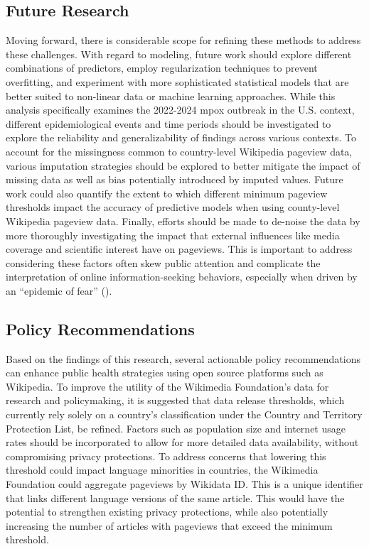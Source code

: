 \documentclass[
  12pt,
]{article}
\begin{document}
\subsection{Future Research}\label{future-research}

Moving forward, there is considerable scope for refining these methods
to address these challenges. With regard to modeling, future work should
explore different combinations of predictors, employ regularization
techniques to prevent overfitting, and experiment with more
sophisticated statistical models that are better suited to non-linear
data or machine learning approaches. While this analysis specifically
examines the 2022-2024 mpox outbreak in the U.S. context, different
epidemiological events and time periods should be investigated to
explore the reliability and generalizability of findings across various
contexts. To account for the missingness common to country-level
Wikipedia pageview data, various imputation strategies should be
explored to better mitigate the impact of missing data as well as bias
potentially introduced by imputed values. Future work could also
quantify the extent to which different minimum pageview thresholds
impact the accuracy of predictive models when using county-level
Wikipedia pageview data. Finally, efforts should be made to de-noise the
data by more thoroughly investigating the impact that external
influences like media coverage and scientific interest have on
pageviews. This is important to address considering these factors often
skew public attention and complicate the interpretation of online
information-seeking behaviors, especially when driven by an ``epidemic
of fear'' ().

\subsection{Policy Recommendations}\label{policy-recommendations}

Based on the findings of this research, several actionable policy
recommendations can enhance public health strategies using open source
platforms such as Wikipedia. To improve the utility of the Wikimedia
Foundation's data for research and policymaking, it is suggested that
data release thresholds, which currently rely solely on a country's
classification under the Country and Territory Protection List, be
refined. Factors such as population size and internet usage rates should
be incorporated to allow for more detailed data availability, without
compromising privacy protections. To address concerns that lowering this
threshold could impact language minorities in countries, the Wikimedia
Foundation could aggregate pageviews by Wikidata ID. This is a unique
identifier that links different language versions of the same article.
This would have the potential to strengthen existing privacy
protections, while also potentially increasing the number of articles
with pageviews that exceed the minimum threshold.~
\end{document}
